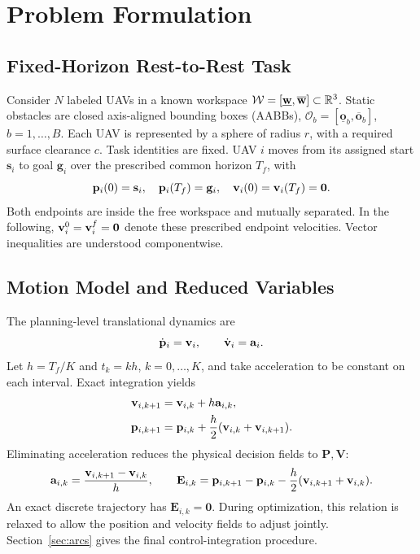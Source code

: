 \section{Problem Formulation}
\label{sec:formulation}
\subsection{Fixed-Horizon Rest-to-Rest Task}
Consider $N$ labeled UAVs in a known workspace $\mathcal W=[\underline{\mathbf w},\overline{\mathbf w}]\subset\mathbb{R}^3$. Static obstacles are closed axis-aligned bounding boxes (AABBs), $\mathcal O_b=[\underline{\mathbf o}_b,\overline{\mathbf o}_b]$, $b=1,\ldots,B$. Each UAV is represented by a sphere of radius $r$, with a required surface clearance $c$. Task identities are fixed. UAV $i$ moves from its assigned start $\mathbf s_i$ to goal $\mathbf g_i$ over the prescribed common horizon $T_f$, with
\begin{equation}
 \mathbf{p}_i(0)=\mathbf s_i,\quad \mathbf{p}_i(T_f)=\mathbf g_i,\quad
 \mathbf{v}_i(0)=\mathbf{v}_i(T_f)=\mathbf0 .
 \label{eq:endpoint}
\end{equation}
Both endpoints are inside the free workspace and mutually separated. In the following, $\mathbf{v}_i^0=\mathbf{v}_i^f=\mathbf0$ denote these prescribed endpoint velocities. Vector inequalities are understood componentwise.

\subsection{Motion Model and Reduced Variables}
The planning-level translational dynamics are
\begin{equation}
 \dot{\mathbf{p}}_i=\mathbf{v}_i,\qquad \dot{\mathbf{v}}_i=\mathbf{a}_i.
 \label{eq:continuous}
\end{equation}
Let $h=T_f/K$ and $t_k=kh$, $k=0,\ldots,K$, and take acceleration to be constant on each interval. Exact integration yields
\begin{subequations}\label{eq:discrete}\begin{align}
 \mathbf{v}_{i,k+1}&=\mathbf{v}_{i,k}+h\mathbf{a}_{i,k},\label{eq:velocityupdate}\\
 \mathbf{p}_{i,k+1}&=\mathbf{p}_{i,k}+\frac h2(\mathbf{v}_{i,k}+\mathbf{v}_{i,k+1}).\label{eq:positionupdate}
\end{align}\end{subequations}
Eliminating acceleration reduces the physical decision fields to $\mathbf P,\mathbf V$:
\begin{equation}
 \mathbf{a}_{i,k}=\frac{\mathbf{v}_{i,k+1}-\mathbf{v}_{i,k}}h,\qquad
 \mathbf E_{i,k}=\mathbf{p}_{i,k+1}-\mathbf{p}_{i,k}
 -\frac h2(\mathbf{v}_{i,k+1}+\mathbf{v}_{i,k}).
 \label{eq:defect}
\end{equation}
An exact discrete trajectory has $\mathbf E_{i,k}=\mathbf0$. During optimization, this relation is relaxed to allow the position and velocity fields to adjust jointly. Section~\ref{sec:arcs} gives the final control-integration procedure.

